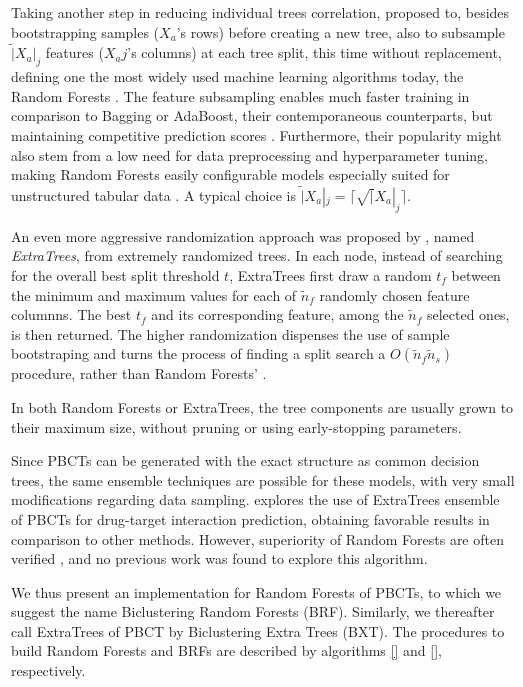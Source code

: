 Taking another step in reducing individual trees correlation, \cite{Breiman_2001} proposed to, besides bootstrapping samples ($X_a$'s rows) before creating a new tree, also to subsample $\tilde |X_a|_j$ features ($X_aj$'s columns) at each tree split, this time without replacement, defining one the most widely used machine learning algorithms today, the Random Forests \cite{}. The feature subsampling enables much faster training in comparison to Bagging or AdaBoost, their contemporaneous counterparts, but maintaining competitive prediction scores \cite{Dietterich_2000}. Furthermore, their popularity might also stem from a low need for data preprocessing and hyperparameter tuning, making Random Forests easily configurable models especially suited for unstructured tabular data \cite{}. {} A typical choice is $\tilde |X_a|_j = \lceil \sqrt |X_a|_j \rceil$.

An even more aggressive randomization approach was proposed by \cite{Geurts_2006}, named \emph{ExtraTrees}, from extremely randomized trees. In each node, instead of searching for the overall best split threshold $t$, ExtraTrees first draw a random $t_f$ between the minimum and maximum values for each of $\tilde n_f$ randomly chosen feature columnns. The best $t_f$ and its corresponding feature, among the $\tilde n_f$ selected ones, is then returned. The higher randomization dispenses the use of sample bootstraping and turns the process of finding a split search a $O(\tilde n_f \tilde n_s)$ {{}} procedure, rather than Random Forests' {}.

In both Random Forests or ExtraTrees, the tree components are usually grown to their maximum size, without pruning or using early-stopping parameters.

Since PBCTs can be generated with the exact structure as common decision trees, the same ensemble techniques are possible for these models, with very small modifications regarding data sampling. \cite{Pliakos_2020} explores the use of ExtraTrees ensemble of PBCTs for drug-target interaction prediction, obtaining favorable results in comparison to other methods. However, superiority of Random Forests are often verified \cite{}, and no previous work was found to explore this algorithm.

We thus present an implementation for Random Forests of PBCTs, to which we suggest the name Biclustering Random Forests (BRF). Similarly, we thereafter call ExtraTrees of PBCT by Biclustering Extra Trees (BXT). The procedures to build Random Forests and BRFs are described by algorithms \ref{} and \ref{}, respectively.

